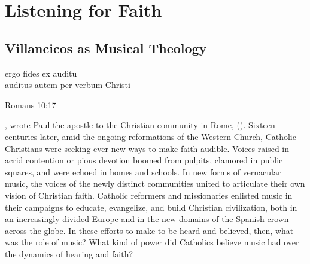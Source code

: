 
% 

\part{Listening for Faith}
\label{part:faith}

\chapter{Villancicos as Musical Theology}
\label{ch:intro}

\epigraph
{ergo fides ex auditu\\
auditus autem per verbum Christi}
{Romans 10:17}

, wrote Paul the apostle to the Christian
community in Rome, 
().
Sixteen centuries later, amid the ongoing reformations of the Western Church,
Catholic Christians were seeking ever new ways to make faith audible.
Voices raised in acrid contention or pious devotion boomed from pulpits,
clamored in public squares, and were echoed in homes and schools.  
In new forms of vernacular music, the voices of the newly distinct communities
united to articulate their own vision of Christian faith.
Catholic reformers and missionaries enlisted music in their campaigns to
educate, evangelize, and build Christian civilization, both in an increasingly
divided Europe and in the new domains of the Spanish crown across the globe.
In these efforts to make  to be heard and believed,
then, what was the role of music?
What kind of power did Catholics believe music had over the dynamics of hearing
and faith?

